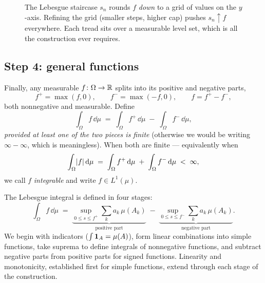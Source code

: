 \begin{figure}[H]
\centering
{}
\caption{The Lebesgue staircase $s_n$ rounds $f$ \emph{down} to a grid of values
on the $y$-axis. Refining the grid (smaller steps, higher cap) pushes
$s_n\uparrow f$ everywhere. Each tread sits over a measurable level set, which is
all the construction ever requires.}
\label{ch37:fig-staircase}
\end{figure}

\subsection{Step 4: general functions}

Finally, any measurable $f\colon\Omega\to\mathbb{R}$ splits into its positive and
negative parts,
\[
  f^+ = \max(f,0), \qquad f^- = \max(-f,0), \qquad f = f^+ - f^-,
\]
both nonnegative and measurable. Define
\[
  \int_\Omega f\,\dd\mu \;=\; \int_\Omega f^+\,\dd\mu \;-\; \int_\Omega
  f^-\,\dd\mu,
\]
\emph{provided at least one of the two pieces is finite} (otherwise we would be
writing $\infty-\infty$, which is meaningless). When both are finite ---
equivalently when
\[
  \int_\Omega \lvert f\rvert\,\mathrm{d}\mu \;=\; \int_\Omega f^+\,\mathrm{d}\mu \;+\; \int_\Omega f^-\,\mathrm{d}\mu \;<\; \infty,
\]
we call $f$ \emph{integrable} and write $f\in L^1(\mu)$.

\begin{formalbox}
The Lebesgue integral is defined in four stages:
\[
  \int_\Omega f\,\dd\mu
  \;=\; \underbrace{\sup_{0\le s\le f^+}\sum_k a_k\,\mu(A_k)}_{\text{positive part}}
  \;-\; \underbrace{\sup_{0\le s\le f^-}\sum_k a_k\,\mu(A_k)}_{\text{negative part}} .
\]
We begin with indicators ($\int\mathbf{1}_A=\mu(A)$), form linear combinations into
simple functions, take suprema to define integrals of nonnegative functions, and
subtract negative parts from positive parts for signed functions. Linearity and
monotonicity, established first for simple functions, extend through each stage
of the construction.
\end{formalbox}

